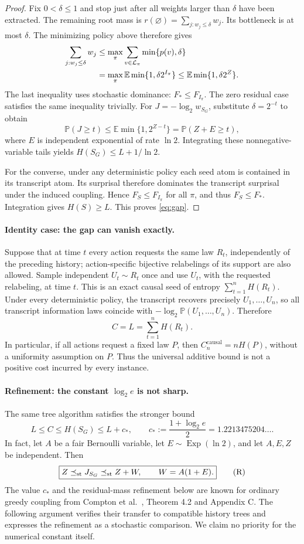 \documentclass[11pt,a4paper]{article}
\newcommand{\E}{\mathbb E}
\newcommand{\Prob}{\mathbb P}
\newcommand{\causal}{\mathrm{causal}}
\begin{document}
\begin{proof}
Fix $0<\delta\le1$ and stop just after all weights larger than $\delta$
have been extracted. The remaining root mass is
$r(\varnothing)=\sum_{j:w_j\le\delta}w_j$. Its bottleneck is at most
$\delta$. The minimizing policy above therefore gives
\begin{align}
\sum_{j:w_j\le\delta}w_j
&\le\max_\pi\sum_{v\in\mathcal L_\pi}\min\{p(v),\delta\}\notag\\
&=\max_\pi\E\min\{1,\delta2^{I_\pi}\}
\le\E\min\{1,\delta2^Z\}.\label{eq:softtail}
\end{align}
The last inequality uses stochastic dominance: $F_*\le F_{I_\pi}$.
The zero residual case satisfies the same inequality trivially.
For $J=-\log_2w_{S_G}$, substitute $\delta=2^{-t}$ to obtain
\[
\Prob(J\ge t)\le\E\min\{1,2^{Z-t}\}
=\Prob(Z+E\ge t),
\]
where $E$ is independent exponential of rate $\ln2$. Integrating these
nonnegative-variable tails yields $H(S_G)\le L+1/\ln2$.

For the converse, under any deterministic policy each seed atom is
contained in its transcript atom. Its surprisal therefore dominates
the transcript surprisal under the induced coupling. Hence
$F_S\le F_{I_\pi}$ for all $\pi$, and thus $F_S\le F_*$. Integration
gives $H(S)\ge L$. This proves \eqref{eq:gap}.
\end{proof}

\paragraph{Identity case: the gap can vanish exactly.}
Suppose that at time $t$ every action requests the same law $R_t$,
independently of the preceding history; action-specific bijective
relabelings of its support are also allowed. Sample independent
$U_t\sim R_t$ once and use $U_t$, with the requested relabeling, at time
$t$. This is an exact causal seed of entropy $\sum_{t=1}^nH(R_t)$.
Under every deterministic policy, the transcript recovers precisely
$U_1,\ldots,U_n$, so all transcript information laws coincide with
$-\log_2\Prob(U_1,\ldots,U_n)$. Therefore
\[
\boxed{C=L=\sum_{t=1}^nH(R_t).}
\]
In particular, if all actions request a fixed law $P$, then
$C_n^{\causal}=nH(P)$, without a uniformity assumption on $P$.
Thus the universal additive bound is not a positive cost incurred by
every instance.

\paragraph{Refinement: the constant $\log_2e$ is not sharp.}
The same tree algorithm satisfies the stronger bound
\[
\boxed{L\le C\le H(S_G)\le L+c_*,\qquad
c_*:=\frac{1+\log_2e}{2}=1.2213475204\ldots.}
\]
In fact, let $A$ be a fair Bernoulli variable, let
$E\sim\operatorname{Exp}(\ln2)$, and let $A,E,Z$ be independent. Then
\[
\boxed{Z\preceq_{\rm st}J_{S_G}\preceq_{\rm st}Z+W,
\qquad W=A(1+E).}
\tag{R}\label{eq:refinedsandwich}
\]
The value $c_*$ and the residual-mass refinement below are known for
ordinary greedy coupling from Compton et al.\ \cite{CKQGK23},
Theorem 4.2 and Appendix C. The following argument verifies their transfer
to compatible history trees and expresses the refinement as a stochastic
comparison. We claim no priority for the numerical constant itself.
\end{document}

